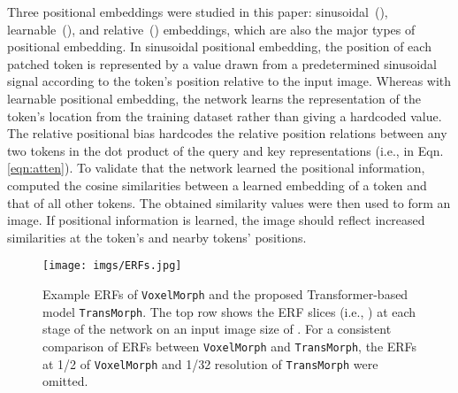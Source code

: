 \documentclass[times,twocolumn,final]{elsarticle}
\begin{document}
Three positional embeddings were studied in this paper: sinusoidal~(\cite{vaswani2017attention}), learnable~(\cite{dosovitskiy2020image}), and relative~(\cite{liu2021swin}) embeddings, which are also the major types of positional embedding. In sinusoidal positional embedding, the position of each patched token is represented by a value drawn from a predetermined sinusoidal signal according to the token's position relative to the input image. Whereas with learnable positional embedding, the network learns the representation of the token's location from the training dataset rather than giving a hardcoded value. The relative positional bias hardcodes the relative position relations between any two tokens in the dot product of the query and key representations (i.e.,  in Eqn. \ref{eqn:atten}). To validate that the network learned the positional information,~\cite{dosovitskiy2020image} computed the cosine similarities between a learned embedding of a token and that of all other tokens. The obtained similarity values were then used to form an image. If positional information is learned, the image should reflect increased similarities at the token's and nearby tokens' positions.
\begin{figure*}[!t]
\centering
\texttt{[image: imgs/ERFs.jpg]}
\caption{Example ERFs of \texttt{VoxelMorph} and the proposed Transformer-based model \texttt{TransMorph}. The top row shows the ERF slices (i.e., ) at each stage of the network on an input image size of . For a consistent comparison of ERFs between \texttt{VoxelMorph} and \texttt{TransMorph}, the ERFs at 1/2 of \texttt{VoxelMorph} and 1/32 resolution of \texttt{TransMorph} were omitted.\label{fig:ERF_example}}
\end{figure*}
\end{document}
